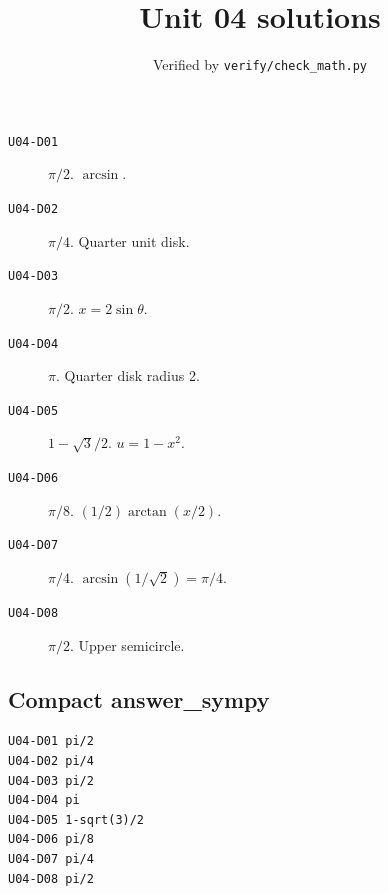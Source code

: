 
\title{Unit 04 solutions}
\author{Verified by \texttt{verify/check\_math.py}}
\date{}

\maketitle
\begin{description}
\item[\texttt{U04-D01}] \(\pi/2\). $\arcsin$.
\item[\texttt{U04-D02}] \(\pi/4\). Quarter unit disk.
\item[\texttt{U04-D03}] \(\pi/2\). $x=2\sin\theta$.
\item[\texttt{U04-D04}] \(\pi\). Quarter disk radius 2.
\item[\texttt{U04-D05}] \(1-\sqrt{3}/2\). $u=1-x^2$.
\item[\texttt{U04-D06}] \(\pi/8\). $(1/2)\arctan(x/2)$.
\item[\texttt{U04-D07}] \(\pi/4\). $\arcsin(1/\sqrt2)=\pi/4$.
\item[\texttt{U04-D08}] \(\pi/2\). Upper semicircle.
\end{description}
\subsection*{Compact answer\_sympy}
\begin{verbatim}
U04-D01 pi/2
U04-D02 pi/4
U04-D03 pi/2
U04-D04 pi
U04-D05 1-sqrt(3)/2
U04-D06 pi/8
U04-D07 pi/4
U04-D08 pi/2
\end{verbatim}

